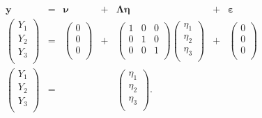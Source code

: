 \documentclass{article}
\begin{document}
\begin{equation}
    \begin{array}{ccccccc}
         \mathbf{y} & = & \boldsymbol{\nu} & + & \boldsymbol{\Lambda} \boldsymbol{\eta} & + & \boldsymbol{\varepsilon} \\
    \left(
    \begin{array}{c}
        Y_{1} \\
        Y_{2} \\
        Y_{3} \\
    \end{array}
    \right)
    & = &
    \left(
    \begin{array}{c}
        0 \\
        0 \\
        0 \\
    \end{array}
    \right)
    & + &
    \left(
    \begin{array}{ccc}
        1 & 0 & 0 \\
        0 & 1 & 0 \\
        0 & 0 & 1 \\
    \end{array}
    \right)
    \left(
    \begin{array}{c}
        \eta_{1} \\
        \eta_{2} \\
        \eta_{3} \\
    \end{array}
    \right)
    & + &
    \left(
    \begin{array}{c}
        0 \\
        0 \\
        0 \\
    \end{array}
    \right) \\
    \left(
    \begin{array}{c}
        Y_{1} \\
        Y_{2} \\
        Y_{3} \\
    \end{array}
    \right)
    & = &
    &   &
    \left(
    \begin{array}{c}
        \eta_{1} \\
        \eta_{2} \\
        \eta_{3} \\
    \end{array}
    \right) .
    &   &
    \\
    \end{array}
\end{equation}
\end{document}
